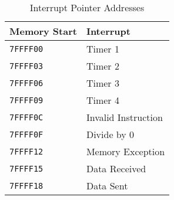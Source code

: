\begin{table}[H]
\centering
\caption{Interrupt Pointer Addresses}
\begin{tabu} spread 0pt{ X[c]  X[l] }
Memory Start & Interrupt \\
\hline
\texttt{7FFFF00} & Timer 1 \\
\texttt{7FFFF03} & Timer 2 \\
\texttt{7FFFF06} & Timer 3 \\
\texttt{7FFFF09} & Timer 4 \\
\texttt{7FFFF0C} & Invalid Instruction \\
\texttt{7FFFF0F} & Divide by 0 \\
\texttt{7FFFF12} & Memory Exception \\
\texttt{7FFFF15} & Data Received \\
\texttt{7FFFF18} & Data Sent \\
\end{tabu}
\end{table}